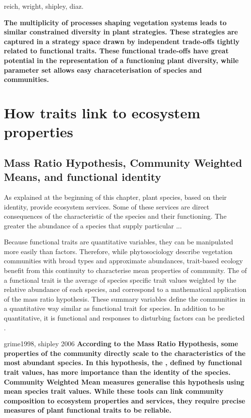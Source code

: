 reich, wright, shipley, diaz.

\textbf{The multiplicity of processes shaping vegetation systems leads to similar constrained diversity in plant strategies. These strategies are captured in a strategy space drawn by independent trade-offs tightly related to functional traits. These functional trade-offs have great potential in the representation of a functioning plant diversity, while parameter set allows easy characeterisation of species and communities.}



\section{How traits link to ecosystem properties}

\subsection{Mass Ratio Hypothesis, Community Weighted Means, and functional identity}

As explained at the beginning of this chapter, plant species, based on their identity, provide ecosystem services. Some of these services are direct consequences of the characteristic of the species and their functioning. The greater the abundance of a species that supply particular ...

Because functional traits are quantitative variables, they can be manipulated more easily than factors. Therefore, while phytosociology describe vegetation communities with broad types and approximate abundances, trait-based ecology benefit from this continuity to characterise mean properties of community. The  of a functional trait is the average of species specific trait values weighted by the relative abundance of each species, and correspond to a mathematical application of the mass ratio hypothesis. These summary variables define the communities in a quantitative way similar as functional trait for species. In addition to be quantitative, it is functional and responses to disturbing factors can be predicted \parencite{lavorel_predicting_2002}.


grime1998, shipley 2006
\textbf{According to the Mass Ratio Hypothesis, some properties of the community directly scale to the characteristics of the most abundant species. In this hypothesis, the , defined by functional trait values, has more importance than the identity of the species. Community Weighted Mean measures generalise this hypothesis using mean species trait values. While these tools can link community composition to ecosystem properties and services, they require precise measures of plant functional traits to be reliable.}

